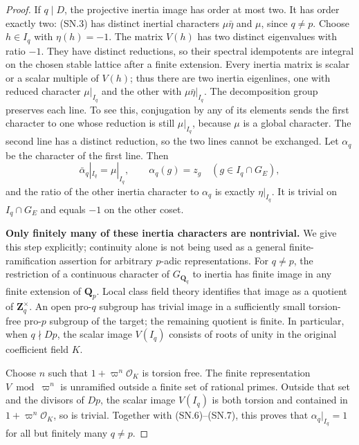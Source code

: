 \documentclass[11pt,a4paper]{article}
\theoremstyle{definition}
\renewcommand{\paragraph}[1]{\par\smallskip\noindent\textbf{#1}\quad\ignorespaces}
\begin{document}
\begin{proof}
If $q\mid D$, the projective inertia image has order at most two.
It has order exactly two: (SN.3) has distinct inertial characters
$\mu\bar\eta$ and $\mu$, since $q\ne p$.
Choose $h\in I_q$ with $\eta(h)=-1$.  The matrix $V(h)$ has two
distinct eigenvalues with ratio $-1$.  They have distinct
reductions, so their spectral idempotents are integral on the
chosen stable lattice after a finite extension.  Every inertia
matrix is scalar or a scalar multiple of $V(h)$; thus there are
two inertia eigenlines, one with reduced character $\mu|_{I_q}$
and the other with $\mu\bar\eta|_{I_q}$.
The decomposition group preserves each line.  To see this,
conjugation by any of its elements sends the first character to
one whose reduction is still $\mu|_{I_q}$, because $\mu$ is a
global character.  The second line has a distinct reduction, so
the two lines cannot be exchanged.
Let $\alpha_q$ be the character of the first line.  Then
\[
 \bar\alpha_q|_{I_q}=\mu|_{I_q},\qquad
 \alpha_q(g)=z_g\quad(g\in I_q\cap G_E),                 \tag{SN.7}
\]
and the ratio of the other inertia character to $\alpha_q$
is exactly $\eta|_{I_q}$.  It is trivial on $I_q\cap G_E$
and equals $-1$ on the other coset.

\paragraph{Only finitely many of these inertia characters are nontrivial.}
We give this step explicitly; continuity alone is not being used
as a general finite-ramification assertion for arbitrary
$p$-adic representations.  For $q\ne p$, the restriction of a
continuous character of $G_{\mathbf Q_q}$ to inertia has finite
image in any finite extension of $\mathbf Q_p$.
Local class field theory identifies that image as a quotient of
$\mathbf Z_q^{\times}$.  An open pro-$q$ subgroup has trivial
image in a sufficiently small torsion-free pro-$p$ subgroup of
the target; the remaining quotient is finite.
In particular, when $q\nmid Dp$, the scalar image $V(I_q)$
consists of roots of unity in the original coefficient field $K$.

Choose $n$ such that $1+\varpi^n\mathcal O_K$ is torsion free.
The finite representation $V\bmod\varpi^n$ is unramified
outside a finite set of rational primes.  Outside that set and
the divisors of $Dp$, the scalar image $V(I_q)$ is both torsion
and contained in $1+\varpi^n\mathcal O_K$, so is trivial.
Together with (SN.6)--(SN.7), this proves that
$\alpha_q|_{I_q}=1$ for all but finitely many $q\ne p$.


\end{proof}
\end{document}
